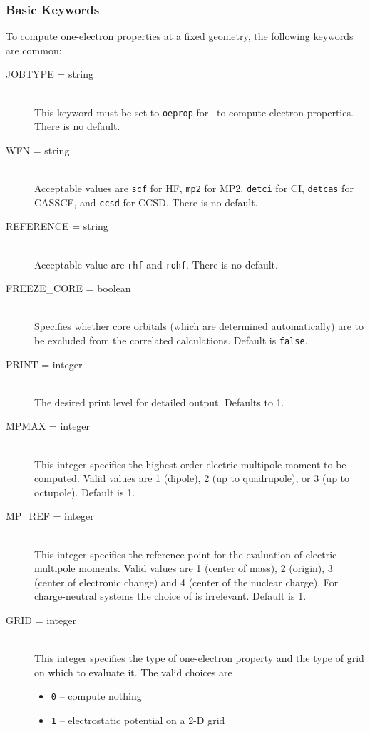 \subsubsection{Basic Keywords}

To compute one-electron properties at a fixed geometry,
the following keywords are common:
\begin{description}
\item[JOBTYPE = string]\mbox{}\\
This keyword must be set to {\tt oeprop} for \PSIthree\
to compute electron properties. There is no default.
\item[WFN = string]\mbox{}\\
Acceptable values are {\tt scf} for HF, {\tt mp2} for MP2,
{\tt detci} for CI, {\tt detcas} for CASSCF, and {\tt ccsd}
for CCSD. There is no default.
\item[REFERENCE = string]\mbox{}\\
Acceptable value are {\tt rhf} and {\tt rohf}. There is no default.
\item[FREEZE\_CORE = boolean]\mbox{}\\
Specifies whether core orbitals (which are determined automatically) are to
be excluded from the correlated calculations.  Default is {\tt false}.
\item[PRINT = integer]\mbox{}\\
The desired print level for detailed output. Defaults to 1.
\item[MPMAX = integer]\mbox{}\\
This integer specifies the highest-order electric multipole moment
to be computed. Valid values are 1 (dipole), 2 (up to quadrupole), or
3 (up to octupole). Default is 1.
\item[MP\_REF = integer]\mbox{}\\
This integer specifies the reference point for the evaluation of
electric multipole moments. Valid values are 1 (center of mass),
2 (origin), 3 (center of electronic change) and
4 (center of the nuclear charge). For charge-neutral systems the
choice of \keyword{MP\_REF} is irrelevant. Default is 1.
\item[GRID = integer]\mbox{}\\
This integer specifies the type of one-electron property and the
type of grid on which to evaluate it. The valid choices are
\begin{itemize}
\item {\tt 0} -- compute nothing
\item {\tt 1} -- electrostatic potential on a 2-D grid

\end{itemize}
\end{description}
